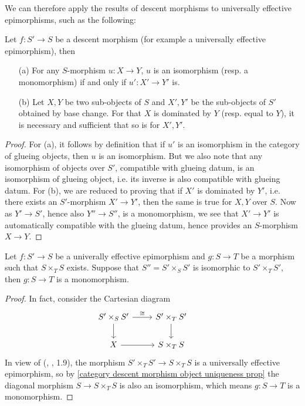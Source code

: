 We can therefore apply the results of descent morphisms to universally effective epimorphisms, such as the following:
\begin{proposition}\label{category descent morphism object uniqueness prop}
Let $f:S'\to S$ be a descent morphism (for example a universally effective epimorphism), then
\begin{enumerate}
    \item[(a)] For any $S$-morphism $u:X\to Y$, $u$ is an isomorphism (resp. a monomorphism) if and only if $u':X'\to Y'$ is.
    \item[(b)] Let $X,Y$ be two sub-objects of $S$ and $X',Y'$ be the sub-objects of $S'$ obtained by base change. For that $X$ is dominated by $Y$ (resp. equal to $Y$), it is necessary and sufficient that so is for $X',Y'$.
\end{enumerate}
\end{proposition}
\begin{proof}
For (a), it follows by definition that if $u'$ is an isomorphism in the category of glueing objects, then $u$ is an isomorphism. But we also note that any isomorphism of objects over $S'$, compatible with glueing datum, is an isomorphism of glueing object, i.e. its inverse is also compatible with glueing datum. For (b), we are reduced to proving that if $X'$ is dominated by $Y'$, i.e. there exists an $S'$-morphism $X'\to Y'$, then the same is true for $X,Y$ over $S$. Now as $Y'\to S'$, hence also $Y''\to S''$, is a monomorphism, we see that $X'\to Y'$ is automatically compatible with the glueing datum, hence provides an $S$-morphism $X\to Y$.
\end{proof}

\begin{corollary}\label{category descent morphism monomorphism if fiber product isomorphic}
Let $f:S'\to S$ be a univerally effective epimorphism and $g:S\to T$ be a morphism such that $S\times_TS$ exists. Suppose that $S''=S'\times_SS'$ is isomorphic to $S'\times_TS'$, then $g:S\to T$ is a monomorphism.
\end{corollary}
\begin{proof}
In fact, consider the Cartesian diagram
\[\begin{tikzcd}
S'\times_SS'\ar[r,"\cong"]\ar[d]&S'\times_TS'\ar[d]&\\
X\ar[r]&S\times_TS
\end{tikzcd}\]
In view of (\cite{SGA3}, , 1.9), the morphism $S'\times_TS'\to S\times_TS$ is a universally effective epimorphism, so by \cref{category descent morphism object uniqueness prop} the diagonal morphism $S\to S\times_TS$ is also an isomorphism, which means $g:S\to T$ is a monomorphism.
\end{proof}

